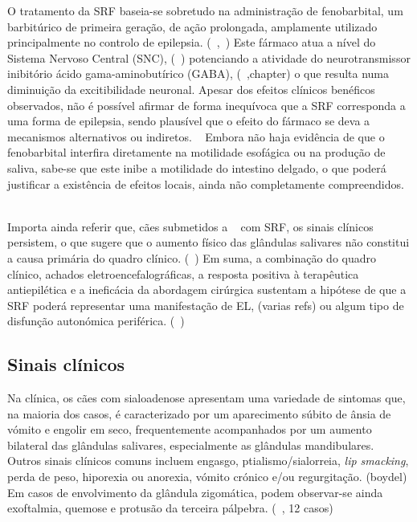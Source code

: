 O tratamento da SRF baseia-se sobretudo na administração de fenobarbital, um barbitúrico de primeira geração, de ação prolongada, amplamente utilizado principalmente no controlo de epilepsia. (~\cite{Papich2021},~\cite{Scott2021}) Este fármaco atua a nível do Sistema Nervoso Central (SNC), (~\cite{Papich2021}) potenciando a atividade do neurotransmissor inibitório ácido gama-aminobutírico (GABA), (~\cite{Trinka2023},chapter) o que resulta numa diminuição da excitibilidade neuronal. Apesar dos efeitos clínicos benéficos observados, não é possível afirmar de forma inequívoca que a SRF corresponda a uma forma de epilepsia, sendo plausível que o efeito do fármaco se deva a mecanismos alternativos ou indiretos. ~\cite{gibbon_phenobarbital-responsive_german_2004} Embora não haja evidência de que o fenobarbital interfira diretamente na motilidade esofágica ou na produção de saliva, sabe-se que este inibe a motilidade do intestino delgado, o que poderá justificar a existência de efeitos locais, ainda não completamente compreendidos. ~\cite{gibbon_phenobarbital-responsive_german_2004}


Importa ainda referir que, cães submetidos a ~\cite{Swieton2022} com SRF, os sinais clínicos persistem, o que sugere que o aumento físico das glândulas salivares não constitui a causa primária do quadro clínico. (~\cite{Kalayanakoul2019}) 
Em suma, a combinação do quadro clínico, achados eletroencefalográficas, a resposta positiva à terapêutica antiepilética e a ineficácia da abordagem cirúrgica sustentam a hipótese de que a SRF poderá representar uma manifestação de EL, (varias refs) ou algum tipo de disfunção autonómica periférica. (~\cite{gibbon_phenobarbital-responsive_german_2004})


\subsection{Sinais clínicos} 

Na clínica, os cães com sialoadenose apresentam uma variedade de sintomas que, na maioria dos casos, é caracterizado por um aparecimento súbito de ânsia de vómito e engolir em seco, frequentemente acompanhados por um aumento bilateral das glândulas salivares, especialmente as glândulas mandibulares. ~\cite{bsava_2020_gastro} Outros sinais clínicos comuns incluem engasgo,  ptialismo/sialorreia, \textit{lip smacking}, perda de peso, hiporexia ou anorexia, vómito crónico e/ou regurgitação. (boydel) Em casos de envolvimento da glândula zigomática, podem observar-se ainda exoftalmia, quemose e protusão da terceira pálpebra. (~\cite{Park2022}, 12 casos) 


